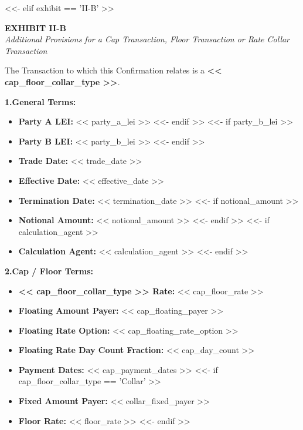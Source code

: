 \documentclass[11pt, a4paper]{article}
\begin{document}
<<- elif exhibit == 'II-B' >>
\begin{center}
    \textbf{EXHIBIT II-B} \\
    \textit{Additional Provisions for a Cap Transaction, Floor Transaction or Rate Collar Transaction}
\end{center}

\noindent The Transaction to which this Confirmation relates is a \textbf{<< cap_floor_collar_type >>}.

\vspace{0.3cm}
\noindent \textbf{1.\quad General Terms:}
\begin{itemize}[leftmargin=2cm, label={}, itemsep=3pt]
<<- if party_a_lei >>
    \item \textbf{Party A LEI:} << party_a_lei >>
<<- endif >>
<<- if party_b_lei >>
    \item \textbf{Party B LEI:} << party_b_lei >>
<<- endif >>
    \item \textbf{Trade Date:} << trade_date >>
    \item \textbf{Effective Date:} << effective_date >>
    \item \textbf{Termination Date:} << termination_date >>
<<- if notional_amount >>
    \item \textbf{Notional Amount:} << notional_amount >>
<<- endif >>
<<- if calculation_agent >>
    \item \textbf{Calculation Agent:} << calculation_agent >>
<<- endif >>
\end{itemize}

\vspace{0.3cm}
\noindent \textbf{2.\quad Cap / Floor Terms:}
\begin{itemize}[leftmargin=2cm, label={}, itemsep=3pt]
    \item \textbf{<< cap_floor_collar_type >> Rate:} << cap_floor_rate >>
    \item \textbf{Floating Amount Payer:} << cap_floating_payer >>
    \item \textbf{Floating Rate Option:} << cap_floating_rate_option >>
    \item \textbf{Floating Rate Day Count Fraction:} << cap_day_count >>
    \item \textbf{Payment Dates:} << cap_payment_dates >>
<<- if cap_floor_collar_type == 'Collar' >>
    \item \textbf{Fixed Amount Payer:} << collar_fixed_payer >>
    \item \textbf{Floor Rate:} << floor_rate >>
<<- endif >>
\end{itemize}
\end{document}
